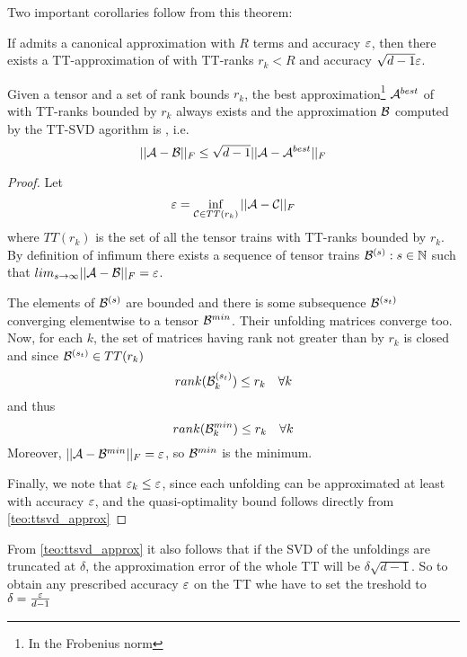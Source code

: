 Two important corollaries follow from this theorem:
\begin{Cor}
  If \A admits a canonical approximation with $R$ terms  and accuracy $\varepsilon$, then there exists a TT-approximation of \A with TT-ranks $r_k < R$ and accuracy $\sqrt{d-1} \varepsilon$.
\end{Cor}
\begin{Cor}
  Given a tensor \A and a set of rank bounds $r_k$, the best approximation\footnote{In the Frobenius norm} $\mathcal{A}^{best}$ of \A with TT-ranks bounded by $r_k$ always exists and the approximation $\mathcal{B}$ computed by the TT-SVD agorithm is , i.e.
  \begin{equation*}
    ||\mathcal{A} - \mathcal{B}||_F \le \sqrt{d-1} ||\mathcal{A} - \mathcal{A}^{best}||_F
  \end{equation*}

  \begin{proof}
    Let
    \begin{equation*}
     \varepsilon = \inf_{\mathcal{C} \in TT(r_k)} ||\mathcal{A} - \mathcal{C}||_F
    \end{equation*}
    where $TT(r_k)$ is the set of all the tensor trains with TT-ranks bounded by $r_k$. By definition of infimum there exists a sequence of tensor trains $\mathcal{B}^{(s)} : s \in \mathbb{N}$ such that $lim_{s\to\infty} ||\mathcal{A} - \mathcal{B}||_F = \varepsilon$.

    The elements of $\mathcal{B}^{(s)}$ are bounded and  there is some subsequence $\mathcal{B}^{(s_t)}$ converging elementwise to a tensor $\mathcal{B}^{min}$. Their unfolding matrices converge too. Now, for each $k$, the set of matrices having rank not greater than by $r_k$ is closed and since $\mathcal{B}^{(s_t)} \in TT(r_k)$
    \begin{equation*}
      rank(\mathcal{B}^{(s_t)}_k) \le r_k \quad \forall k
    \end{equation*}
    and thus
    \begin{equation*}
      rank(\mathcal{B}^{min}_k) \le r_k \quad \forall k
    \end{equation*}
    Moreover, $||\mathcal{A} - \mathcal{B}^{min}||_F = \varepsilon$,  so $\mathcal{B}^{min}$ is the minimum.

    Finally, we note that $\varepsilon_k \le \varepsilon$, since each unfolding can be approximated at least with accuracy $\varepsilon$, and the quasi-optimality bound follows directly from \ref{teo:ttsvd_approx}
  \end{proof}
\end{Cor}

\begin{Cor}
  From \ref{teo:ttsvd_approx} it also follows that if the SVD of the unfoldings are truncated at $\delta$, the approximation error of the whole TT will be $\delta \sqrt{d-1}$. So to obtain any prescribed accuracy $\varepsilon$ on the TT whe have to set the treshold to $\delta = \frac{\varepsilon}{d-1}$
\end{Cor}

